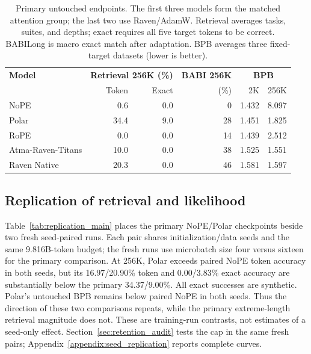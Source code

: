 \documentclass{article}
\begin{document}
\begin{table}[t]
\centering
\small
\setlength{\tabcolsep}{4pt}
\begin{tabular}{lrrrrr}
\toprule
\textbf{Model} & \multicolumn{2}{c}{\textbf{Retrieval 256K (\%)}} & \textbf{BABI 256K} & \multicolumn{2}{c}{\textbf{BPB}} \\
 & Token & Exact & (\%) & 2K & 256K \\
\midrule
NoPE & 0.6 & 0.0 & 0 & 1.432 & 8.097 \\
Polar & 34.4 & 9.0 & 28 & 1.451 & 1.825 \\
RoPE & 0.0 & 0.0 & 14 & 1.439 & 2.512 \\
\midrule
Atma-Raven-Titans & 10.0 & 0.0 & 38 & 1.525 & 1.551 \\
Raven Native & 20.3 & 0.0 & 46 & 1.581 & 1.597 \\
\bottomrule
\end{tabular}
\caption{Primary untouched endpoints. The first three models form the matched attention group; the last two use Raven/AdamW. Retrieval averages tasks, suites, and depths; exact requires all five target tokens to be correct. BABILong is macro exact match after adaptation. BPB averages three fixed-target datasets (lower is better).}
\label{tab:endpoints}
\end{table}

\subsection{Replication of retrieval and likelihood}
Table~\ref{tab:replication_main} places the primary NoPE/Polar checkpoints beside two fresh seed-paired runs. Each pair shares initialization/data seeds and the same 9.816B-token budget; the fresh runs use microbatch size four versus sixteen for the primary comparison. At 256K, Polar exceeds paired NoPE token accuracy in both seeds, but its 16.97/20.90\% token and 0.00/3.83\% exact accuracy are substantially below the primary 34.37/9.00\%. All exact successes are synthetic. Polar's untouched BPB remains below paired NoPE in both seeds. Thus the direction of these two comparisons repeats, while the primary extreme-length retrieval magnitude does not. These are training-run contrasts, not estimates of a seed-only effect. Section~\ref{sec:retention_audit} tests the cap in the same fresh pairs; Appendix~\ref{appendix:seed_replication} reports complete curves.
\end{document}
